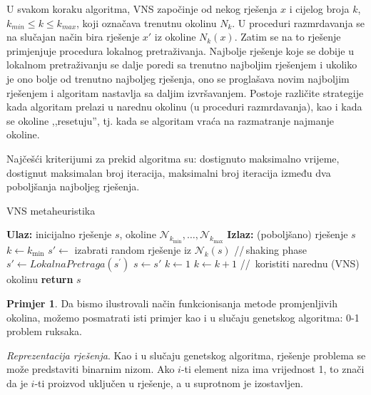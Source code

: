 \documentclass[a4paper, utf8, 11pt, colorlinks]{book}
\theoremstyle{definition}
\newtheorem{primjer}{Primjer}[chapter]
\begin{document}
U svakom koraku algoritma, VNS započinje od nekog rješenja $x$ i cijelog broja $k$, $k_{min}\leqslant k\leqslant k_{max}$, koji označava trenutnu okolinu $N_k$. U proceduri razmrdavanja
se na slučajan način bira rješenje  $x'$ iz okoline  $N_k(x)$. Zatim se na to rješenje primjenjuje procedura lokalnog pretraživanja. Najbolje rješenje koje se dobije u lokalnom pretraživanju se dalje poredi sa trenutno najboljim rješenjem i ukoliko je ono bolje od trenutno najboljeg rješenja, ono se proglašava novim najboljim rješenjem i algoritam nastavlja sa daljim izvršavanjem. Postoje različite strategije kada algoritam prelazi u narednu okolinu (u proceduri razmrdavanja), kao i kada se okoline ,,resetuju'', tj. kada se algoritam vraća na razmatranje najmanje okoline. 

Najčešći kriterijumi za prekid   algoritma su: dostignuto maksimalno  vrijeme, dostignut maksimalan broj iteracija, maksimalni broj iteracija između dva poboljšanja najboljeg rješenja. %

    \begin{algorithm}[!t] 
	\caption{VNS metaheuristika}\label{alg:vns}
	\begin{algorithmic}[1]
		\STATE \textbf{Ulaz:} inicijalno rješenje $s$, okoline $\mathcal{N}_{k_{\min}},\ldots, \mathcal{N}_{k_{\max}}$ 
		\STATE \textbf{Izlaz:} (poboljšano) rješenje $s$
		\STATE $k \gets  k_{\min}$
		\STATE  $s' \gets$ izabrati random rješenje iz $\mathcal{N}_k(s)$ \hspace{0.3cm}//\,shaking phase 
		\STATE $s' \gets  LokalnaPretraga(s^{'})$
		\STATE $s \gets s'$
		\STATE $k \gets 1$
		\ELSE 
		\STATE $k \gets k+1$ \hspace{0.3cm}//\, koristiti narednu (VNS) okolinu
		\ENDIF
		\ENDWHILE
		\ENDWHILE
		\STATE \textbf{return} $s$
	\end{algorithmic}
\end{algorithm}


\begin{primjer} Da bismo ilustrovali način funkcionisanja metode promjenljivih okolina, možemo posmatrati isti primjer kao i u slučaju genetskog algoritma: 0-1 problem ruksaka. 
\end{primjer}

\emph{Reprezentacija rješenja}. Kao i u slučaju genetskog algoritma, rješenje problema se može predstaviti binarnim nizom. Ako $i$-ti element niza ima vrijednost 1, to znači da je $i$-ti proizvod uključen u rješenje, a u suprotnom je izostavljen.
\end{document}
